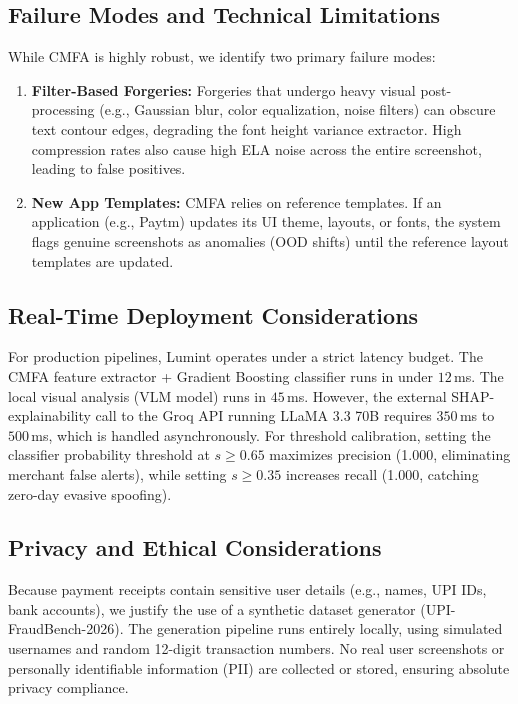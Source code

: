 \documentclass[journal]{IEEEtran}
\begin{document}
\subsection{Failure Modes and Technical Limitations}
While CMFA is highly robust, we identify two primary failure modes:
\begin{enumerate}
    \item \textbf{Filter-Based Forgeries:} Forgeries that undergo heavy visual post-processing (e.g., Gaussian blur, color equalization, noise filters) can obscure text contour edges, degrading the font height variance extractor. High compression rates also cause high ELA noise across the entire screenshot, leading to false positives.
    \item \textbf{New App Templates:} CMFA relies on reference templates. If an application (e.g., Paytm) updates its UI theme, layouts, or fonts, the system flags genuine screenshots as anomalies (OOD shifts) until the reference layout templates are updated.
\end{enumerate}

\subsection{Real-Time Deployment Considerations}
For production pipelines, Lumint operates under a strict latency budget. The CMFA feature extractor + Gradient Boosting classifier runs in under $12\,$ms. The local visual analysis (VLM model) runs in $45\,$ms. However, the external SHAP-explainability call to the Groq API running LLaMA 3.3 70B requires $350\,$ms to $500\,$ms, which is handled asynchronously. For threshold calibration, setting the classifier probability threshold at $s \geq 0.65$ maximizes precision (1.000, eliminating merchant false alerts), while setting $s \geq 0.35$ increases recall (1.000, catching zero-day evasive spoofing).

\subsection{Privacy and Ethical Considerations}
Because payment receipts contain sensitive user details (e.g., names, UPI IDs, bank accounts), we justify the use of a synthetic dataset generator (UPI-FraudBench-2026). The generation pipeline runs entirely locally, using simulated usernames and random 12-digit transaction numbers. No real user screenshots or personally identifiable information (PII) are collected or stored, ensuring absolute privacy compliance.
\end{document}
